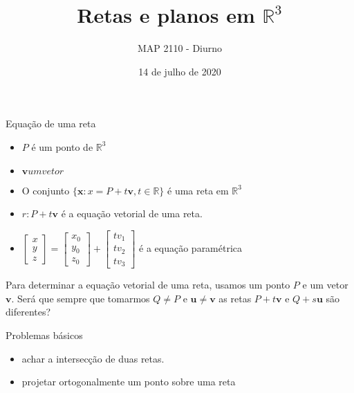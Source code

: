 \documentclass{beamer}
\title[Retas e planos]{Retas e planos em $\mathbb{R}^3$}
\author{MAP 2110 - Diurno}
\institute{IME USP}
\date{14 de julho de 2020}
\begin{document}
\begin{frame}
  \titlepage
\end{frame}

\begin{frame}{Equação de uma reta}

  \begin{itemize}
    \item $P$ é um ponto de $\mathbb{R}^3$
    \item $\mathbf{v} um vetor$
    \item O conjunto $\{ \mathbf{x} : x = P+t\mathbf{v}, t\in \mathbb{R}\}$ é uma reta em $\mathbb{R}^3$
    \item $r:P+t\mathbf{v}$ é a equação vetorial de uma reta.
    \item $\begin{bmatrix}
      x \\ y \\ z
    \end{bmatrix} = \begin{bmatrix}
      x_0 \\ y_0 \\ z_0
    \end{bmatrix}+ \begin{bmatrix}
      tv_1 \\ tv_2 \\ tv_3
    \end{bmatrix}$ é a equação paramétrica
  \end{itemize}
  
\end{frame}

\begin{frame}

  Para determinar a equação vetorial de uma reta, usamos um ponto $P$ e um vetor $\mathbf{v}$. Será que
  sempre que tomarmos $Q\neq P$ e $\mathbf{u} \neq \mathbf{v}$ as retas $P+t\mathbf{v}$ e $Q+s\mathbf{u}$ são diferentes?

\end{frame}

\begin{frame} {Problemas básicos}

  \begin{itemize}
    \item achar a intersecção de duas retas.
    \item projetar ortogonalmente um ponto sobre uma reta
  \end{itemize}
  
\end{frame}
\end{document}

